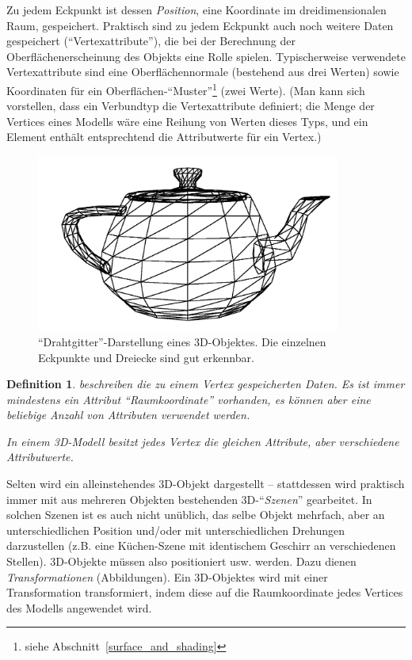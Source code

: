 \documentclass[twoside,a4paper,fleqn,12pt]{book}
\newtheorem{defn}{Definition}
\begin{document}
Zu jedem Eckpunkt ist dessen \emph{Position}, eine Koordinate im dreidimensionalen Raum, gespeichert.
Praktisch sind zu jedem Eckpunkt auch noch weitere Daten gespeichert ("`Vertexattribute"'),
die bei der Berechnung der Oberflächenerscheinung des Objekts eine Rolle spielen.
Typischerweise verwendete Vertexattribute sind eine Oberflächennormale (bestehend aus drei Werten)
sowie Koordinaten für ein Oberflächen-"`Muster"'\footnote{siehe Abschnitt~\ref{surface_and_shading}} (zwei Werte).
(Man kann sich vorstellen, dass ein Verbundtyp die Vertexattribute definiert; die Menge der Vertices eines Modells wäre
eine Reihung von Werten dieses Typs, und ein Element enthält entsprechtend die Attributwerte für ein Vertex.)

\begin{figure}[h]
  \centering
  \includegraphics[width=10cm]{mesh_wireframe_thick}
  \caption{"`Drahtgitter"'-Darstellung eines 3D-Objektes. Die einzelnen Eckpunkte und Dreiecke sind gut erkennbar.}
  \label{fig:wireframe_teapot}
\end{figure}

\begin{defn}
 beschreiben die zu einem Vertex gespeicherten Daten. Es ist immer mindestens
ein Attribut "`Raumkoordinate"' vorhanden, es können aber eine beliebige Anzahl von Attributen verwendet werden.

In einem 3D-Modell besitzt jedes Vertex die gleichen Attribute, aber verschiedene Attribut\emph{werte}.
\end{defn}

Selten wird ein alleinstehendes 3D-Objekt dargestellt -- stattdessen wird praktisch immer mit aus mehreren Objekten
bestehenden 3D-"`\emph{Szenen}"' gearbeitet. In solchen Szenen ist es auch nicht unüblich, das selbe Objekt mehrfach,
aber an unterschiedlichen Position \mbox{und/oder} mit unterschiedlichen Drehungen darzustellen (z.B. eine Küchen-Szene mit identischem
Geschirr an verschiedenen Stellen). 3D-Objekte müssen also positioniert usw. werden. Dazu dienen \emph{Transformationen}
(Abbildungen). Ein 3D-Objektes wird mit einer Transformation transformiert, indem diese auf die Raumkoordinate jedes Vertices
des Modells angewendet wird.
\end{document}
